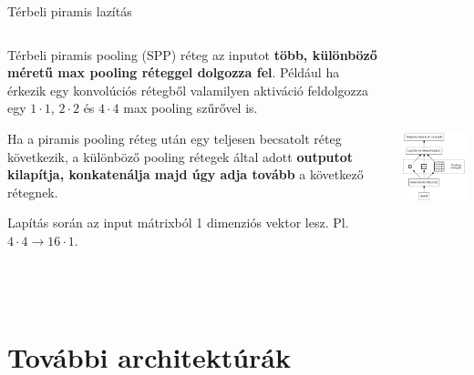 \documentclass[english, aspectratio=169]{beamer}
\makeatletter
\let\origtableofcontents=\tableofcontents
\def\tableofcontents{\@ifnextchar[{\origtableofcontents}{\gobbletableofcontents}}
\def\gobbletableofcontents#1{\origtableofcontents}
\makeatother
\begin{document}
	\begin{frame}{Térbeli piramis lazítás}
		\begin{columns}
			\begin{column}{.5\textwidth}
				Térbeli piramis pooling (SPP) réteg az inputot \textbf{több, különböző méretű max pooling réteggel dolgozza fel}. Például ha érkezik egy konvolúciós rétegből valamilyen aktiváció feldolgozza egy $1 \cdot 1$, $2 \cdot 2$ és $4 \cdot 4$ max pooling szűrővel is.\par\smallskip
				Ha a piramis pooling réteg után egy teljesen becsatolt réteg következik, a különböző pooling rétegek által adott \textbf{outputot kilapítja, konkatenálja majd úgy adja tovább} a következő rétegnek.\par\smallskip
				Lapítás során az input mátrixból 1 dimenziós vektor lesz. Pl. $4 \cdot 4 \rightarrow 16 \cdot 1$.
			\end{column}
			\begin{column}{.5\textwidth}
				\begin{center}
					\includegraphics[height=7cm, keepaspectratio]{graphs/od_4.png}
				\end{center}
			\end{column}
		\end{columns}
	\end{frame}
	
	\section{További architektúrák}
	
	\begin{frame}
		\tableofcontents[currentsection]
	\end{frame}
	
\end{document}
